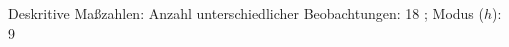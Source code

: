 				\label{tableValues:astu013k_g3r}
				\vspace*{-\baselineskip}
                    \begin{noten}
                	    \note{} Deskritive Maßzahlen:
                	    Anzahl unterschiedlicher Beobachtungen: 18%
                	    ; 
                	      Modus ($h$): 9
                     \end{noten}


